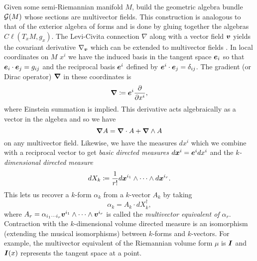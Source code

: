 \documentclass[conf]{new-aiaa}
\begin{document}
Given some semi-Riemannian manifold $M$, build the geometric algebra bundle $\mathcal{G}(M)$ whose sections are multivector fields. This construction is analogous to that of the exterior algebra of forms and is done by gluing together the algebras $C\ell(T_xM,g_x)$.  The Levi-Civita connection $\nabla$ along with a vector field $\boldsymbol{v}$ yields the covariant derivative $\nabla_{\boldsymbol{v}}$ which can be extended to multivector fields \cite{schindler_geometric_2020}. In local coordinates on $M$ $x^i$ we have the induced basis in the tangent space $\boldsymbol{e}_i$ so that $\boldsymbol{e}_i\cdot \boldsymbol{e}_j = g_{ij}$ and the reciprocal basis $\boldsymbol{e}^i$ defined by $\boldsymbol{e}^i\cdot \boldsymbol{e}_j = \delta_{ij}$. The gradient (or Dirac operator) $\boldsymbol{\nabla}$ in these coordinates is
\begin{equation}
    \boldsymbol{\nabla} \coloneqq \boldsymbol{e}^i \frac{\partial}{\partial x^i},
\end{equation}
where Einstein summation is implied. This derivative acts algebraically as a vector in the algebra and so we have
\begin{equation}
\boldsymbol{\nabla} A = \boldsymbol{\nabla} \cdot A + \boldsymbol{\nabla} \wedge A
\end{equation}
on any multivector field. Likewise, we have the measures $dx^i$ which we combine with a reciprocal vector to get \emph{basic directed measures} $d\boldsymbol{x}^i = \boldsymbol{e}^i dx^i$ and the \emph{$k$-dimensional directed measure}
\begin{equation}
    dX_k \coloneqq \frac{1}{r!} d\boldsymbol{x}^{i_1}\wedge \cdots \wedge d\boldsymbol{x}^{i_r}.
\end{equation}
This lets us recover a $k$-form $\alpha_k$ from a $k$-vector $A_k$ by taking
\begin{equation}
\alpha_k = A_k \cdot dX_k^\dagger,
\end{equation}
where $A_r = \alpha_{i_1 \cdots i_r} \boldsymbol{v}^{i_1} \wedge \cdots \wedge \boldsymbol{v}^{i_r}$ is called the \emph{multivector equivalent of $\alpha_r$}. Contraction with the $k$-dimensional volume directed measure is an isomorphism (extending the musical isomorphisms) between $k$-forms and $k$-vectors. For example, the multivector equivalent of the Riemannian volume form $\mu$ is $\boldsymbol{I}$ and $\boldsymbol{I}(x)$ represents the tangent space at a point. 
\end{document}
